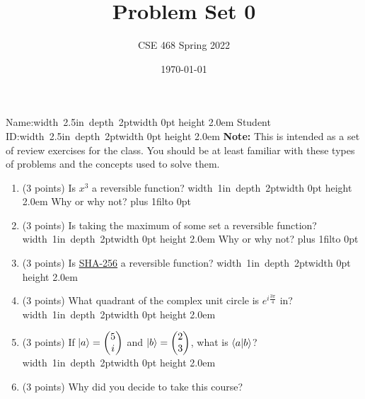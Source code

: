 \documentclass[12pt]{article}
\title{Problem Set 0}
\author{CSE 468 Spring 2022}
\date{\today}
\newcommand{\Blank}{\mbox{\hskip 4pt\vrule width 1in depth 2pt}\vrule width 0pt height 2.0em}
\newcommand{\NameBlank}{\mbox{\hskip 4pt\vrule width 2.5in depth 2pt}\vrule width 0pt height 2.0em}
\def\DefaultSpace{1in}
\newcommand{\LeaveSpace}[1][\DefaultSpace]{%
\vskip #1 plus 1fil\relax\hbox to 0pt{\hss} %
}
\begin{document}
\maketitle

\noindent Name:\NameBlank{} \newline
\noindent Student ID:\NameBlank{} \newline
\newline
\noindent \textbf{Note:} This is intended as a set of review exercises for the class. You should be at least familiar with these types of problems and the concepts used to solve them.

\begin{enumerate}[font=\bfseries]
    \item (3 points) Is $x^3$ a reversible function? \Blank{} Why or why not? \LeaveSpace[0.5in]
    \item (3 points) Is taking the maximum of some set a reversible function? \Blank{} Why or why not?\LeaveSpace{}
    \item (3 points) Is \href{https://en.wikipedia.org/wiki/SHA-2}{SHA-256} a reversible function? \Blank{} 
    \item (3 points) What quadrant of the complex unit circle is $e^{i\frac{3\pi}{4}}$ in?\Blank{}
    \item (3 points) If $\ket{a} = \begin{pmatrix}5 \\ i \end{pmatrix}$ and $\ket{b} = \begin{pmatrix}2 \\ 3 \end{pmatrix}$, what is $\braket{a|b}$?\Blank{}
    \item (3 points) Why did you decide to take this course? \newline
    
\end{enumerate}
\end{document}

